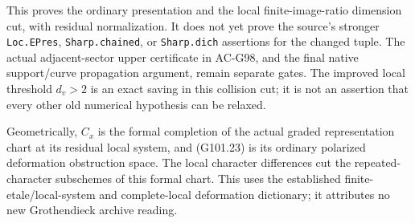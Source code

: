 This proves the ordinary presentation and the local
finite-image-ratio dimension cut, with residual normalization.
It does not yet prove the source's stronger
\texttt{Loc.EPres}, \texttt{Sharp.chained}, or
\texttt{Sharp.dich} assertions for the changed tuple.
The actual adjacent-sector upper certificate in AC-G98,
and the final native support/curve propagation argument, remain
separate gates.  The improved local threshold \(d_v>2\) is
an exact saving in this collision cut; it is not an assertion
that every other old numerical hypothesis can be relaxed.

Geometrically, \(C_x\) is the formal completion of the actual
graded representation chart at its residual local system,
and (G101.23) is its ordinary polarized deformation obstruction
space.  The local character differences cut the repeated-character
subschemes of this formal chart.  This uses the established
finite-etale/local-system and complete-local deformation dictionary;
it attributes no new Grothendieck archive reading.
